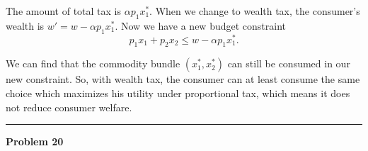 \documentclass[letterpaper, 11pt]{article}
\newcommand{\1}{\mathds{1}}	%
\theoremstyle{definition}
\begin{document}
The amount of total tax is $\alpha p_1 x_1^*$. When we change to wealth tax, the consumer's wealth is $w' = w - \alpha p_1 x_1^*$. Now we have a new budget constraint \[
    p_1x_1 + p_2x_2 \leq w - \alpha p_1 x_1^*.
\]

We can find that the commodity bundle $(x_1^*, x_2^*)$ can still be consumed in our new constraint. So, with wealth tax, the consumer can at least consume the same choice which maximizes his utility under proportional tax, which means it does not reduce consumer welfare.


\bigskip
\hrule
\bigskip

\textbf{Problem 20}





\end{document}
